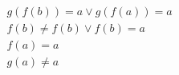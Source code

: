 \begin{align*}
%
& g(f(b)) = a \lor g(f(a)) = a
~\\~
& f(b)  \neq  f(b) \lor f(b) = a
~\\~
& f(a) = a
~\\~
& g(a)  \neq  a
%
\end{align*}
